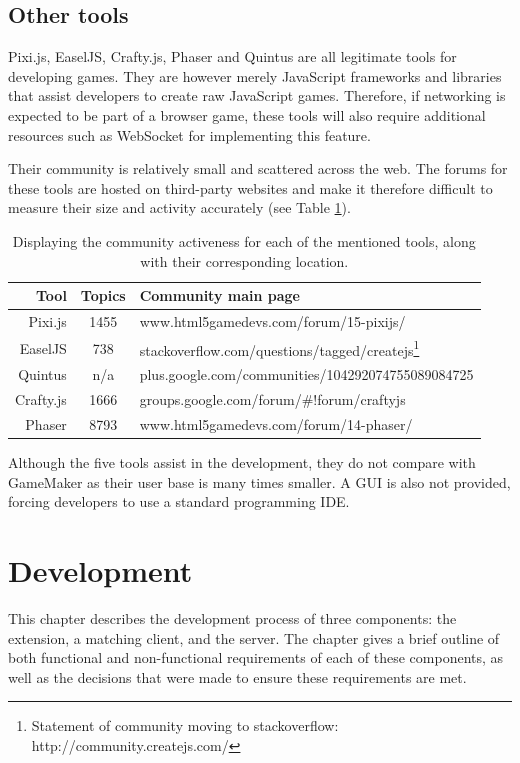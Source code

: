 \documentclass[bsc, 12pt, twoside, singlespacing, parskip, abbrevs, notimes, normalheadings, logo]{styles/infthesis}
\begin{document}

\section{Other tools}
Pixi.js, EaselJS, Crafty.js, Phaser and Quintus are all legitimate tools for developing games. They are however merely JavaScript frameworks and libraries that assist developers to create raw JavaScript games. Therefore, if networking is expected to be part of a browser game, these tools will also require additional resources such as WebSocket for implementing this feature.

Their community is relatively small and scattered across the web. The forums for these tools are hosted on third-party websites and make it therefore difficult to measure their size and activity accurately (see Table \ref{table:JS_Framework_Libraries}).


\begin{table}[H]
\centering
  \begin{tabular}{ | r || c | l | }
  \hline
  	\textbf{Tool}			& \textbf{Topics}	& \textbf{Community main page}	\\ \hline\hline
    Pixi.js			& 1455		& www.html5gamedevs.com/forum/15-pixijs/		\\ \hline
    EaselJS			& 738		& stackoverflow.com/questions/tagged/createjs\footnote{Statement of community moving to stackoverflow: http://community.createjs.com/}		\\ \hline
   	Quintus			& n/a		& plus.google.com/communities/104292074755089084725		\\ \hline
    Crafty.js		& 1666		& groups.google.com/forum/\#!forum/craftyjs		\\ \hline
    Phaser			& 8793		& www.html5gamedevs.com/forum/14-phaser/		\\ \hline
  \end{tabular}
  \caption{Displaying the community activeness for each of the mentioned tools, along with their corresponding location.}
\label{table:JS_Framework_Libraries}
\end{table}


Although the five tools assist in the development, they do not compare with GameMaker as their user base is many times smaller. A GUI is also not provided, forcing developers to use a standard programming IDE.


\chapter{Development}
This chapter describes the development process of three components: the extension, a matching client, and the server. The chapter gives a brief outline of both functional and non-functional requirements of each of these components, as well as the decisions that were made to ensure these requirements are met.
\end{document}
